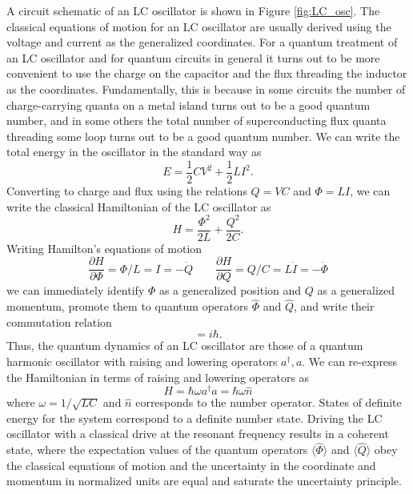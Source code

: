 A circuit schematic of an LC oscillator is shown in Figure \ref{fig:LC_osc}.  The classical equations of motion for an LC oscillator are usually derived using the voltage and current as the generalized coordinates.  For a quantum treatment of an LC oscillator and for quantum circuits in general it turns out to be more convenient to use the charge on the capacitor and the flux threading the inductor as the coordinates.  Fundamentally, this is because in some circuits the number of charge-carrying quanta on a metal island turns out to be a good quantum number, and in some others the total number of superconducting flux quanta threading some loop turns out to be a good quantum number.  We can write the total energy in the oscillator in the standard way as
\begin{equation}
E = \frac{1}{2} C V^2 + \frac{1}{2} L I^2.
\label{eq:LC_E}
\end{equation}
Converting to charge and flux using the relations $Q = VC$ and $\Phi = LI$, we can write the classical Hamiltonian of the LC oscillator as
\begin{equation}
H = \frac{\Phi^2}{2L} + \frac{Q^2}{2C}.
\label{eq:LC_H}
\end{equation}
Writing Hamilton's equations of motion
\begin{equation}
\frac{\partial H}{\partial \Phi} = \Phi/L = I = -\dot{Q} \quad \quad \frac{\partial H}{\partial Q} = Q/C = L\dot{I} = -\dot{\Phi}
\label{eq:LC_hams}
\end{equation}
we can immediately identify $\Phi$ as a generalized position and $Q$ as a generalized momentum, promote them to quantum operators $\hat{\Phi}$ and $\hat{Q}$, and write their commutation relation
\begin{equation}
[\hat{\Phi},\hat{Q}] = i \hbar.
\label{eq:LC_comm}
\end{equation}
Thus, the quantum dynamics of an LC oscillator are those of a quantum harmonic oscillator with raising and lowering operators $a^\dagger,a$.  We can re-express the Hamiltonian in terms of raising and lowering operators as
\begin{equation}
H = \hbar \omega a^\dagger a = \hbar \omega \hat{n}
\label{eq:LC_H_N}
\end{equation}
where $\omega = 1/\sqrt{LC}$ and $\hat{n}$ corresponds to the number operator.
States of definite energy for the system correspond to a definite number state.  Driving the LC oscillator with a classical drive at the resonant frequency results in a coherent state, where the expectation values of the quantum operators $\langle \hat{\Phi} \rangle$ and $\langle \hat{Q} \rangle$ obey the classical equations of motion and the uncertainty in the coordinate and momentum in normalized units are equal and saturate the uncertainty principle.

